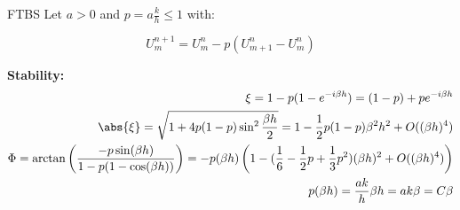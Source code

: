 \begin{example}{FTBS}{}
  Let \(a > 0\) and \(p = a \frac{k}{h} \leq 1\) with:

  \[
    U_m^{n+1} = U_m^n - p(U_{m+1}^n - U_m^n)
  \]

  \textbf{Stability:}
  \begin{align*}
    \xi = 1 - p(1 - e^{-i\beta h}) = (1 - p) + pe^{-i\beta h}                                                                                                                        \\
    \abs{\xi} = \sqrt{1 + 4p(1-p)\sin^2\frac{\beta h}{2}} = 1 - \frac{1}{2}p(1-p)\beta^2 h^2 + O((\beta h)^4)                                                                        \\
    \Phi = \arctan\left(\frac{-p\sin(\beta h)}{1-p(1-\cos(\beta h))}\right) = -p (\beta h)\left(1 - (\frac{1}{6} - \frac{1}{2}p + \frac{1}{3}p^2)(\beta h)^2 + O((\beta h)^4)\right) \\
    p (\beta h) = \frac{a k}{h} \beta h = a k \beta = C \beta
  \end{align*}

\end{example}

